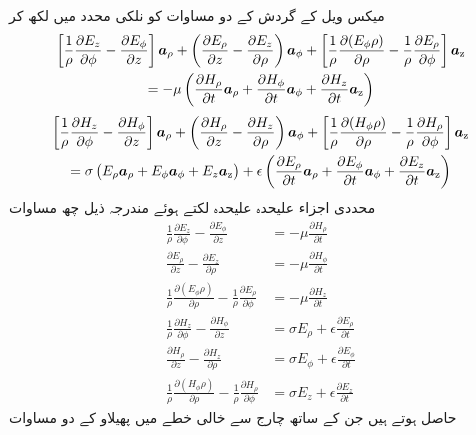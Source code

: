 میکس ویل کے  گردش کے دو مساوات  کو نلکی محدد میں لکھ کر
\begin{multline*}
\left[\frac{1}{\rho}\frac{\partial E_z}{\partial \phi} -\frac{\partial E_{\phi}}{\partial z}\right]{\boldsymbol{a}}_{\rho}+\left(\frac{\partial E_\rho}{\partial z}-\frac{\partial E_z}{\partial \rho} \right){\boldsymbol{a}}_{\phi}+\left[\frac{1}{\rho}\frac{\partial (E_{\phi}\rho )}{\partial \rho}-\frac{1}{\rho}\frac{\partial E_{\rho}}{\partial \phi}\right]{\boldsymbol{a}}_{\textup{z}} \\
=-\mu \left(\frac{\partial H_{\rho}}{\partial t} {\boldsymbol{a}}_{\rho}+\frac{\partial H_{\phi}}{\partial t}{\boldsymbol{a}}_{\phi}+\frac{\partial H_{z}}{\partial t} {\boldsymbol{a}}_{\textup{z}} \right)
\end{multline*}
%
\begin{multline*}
\left[\frac{1}{\rho}\frac{\partial H_z}{\partial \phi} -\frac{\partial H_{\phi}}{\partial z}\right]{\boldsymbol{a}}_{\rho}+\left(\frac{\partial H_\rho}{\partial z}-\frac{\partial H_z}{\partial \rho} \right){\boldsymbol{a}}_{\phi}+\left[\frac{1}{\rho}\frac{\partial (H_{\phi}\rho )}{\partial \rho}-\frac{1}{\rho}\frac{\partial H_{\rho}}{\partial \phi}\right]{\boldsymbol{a}}_{\textup{z}} \\
=\sigma\left(E_{\rho}{\boldsymbol{a}}_{\rho}+E_{\phi}{\boldsymbol{a}}_{\phi}+E_z {\boldsymbol{a}}_{\textup{z}} \right)+\epsilon \left(\frac{\partial E_{\rho}}{\partial t}{\boldsymbol{a}}_{\rho}+\frac{\partial E_{\phi}}{\partial t} {\boldsymbol{a}}_{\phi}+\frac{\partial E_{z}}{\partial t} {\boldsymbol{a}}_{\textup{z}}\right)
\end{multline*} 
محددی اجزاء علیحدہ علیحدہ لکتے ہوئے مندرجہ ذیل چھ مساوات
\begin{align}
\frac{1}{\rho}\frac{\partial E_z}{\partial \phi} -\frac{\partial E_{\phi}}{\partial z}&=-\mu \frac{\partial H_{\rho}}{\partial t} \label{مساوات_مویج_نلکی_الف}\\
\frac{\partial E_\rho}{\partial z}-\frac{\partial E_z}{\partial \rho}&=-\mu\frac{\partial H_{\phi}}{\partial t}\\
\frac{1}{\rho}\frac{\partial (E_{\phi}\rho )}{\partial \rho}-\frac{1}{\rho}\frac{\partial E_{\rho}}{\partial \phi} &=-\mu \frac{\partial H_{z}}{\partial t}\\
\frac{1}{\rho}\frac{\partial H_z}{\partial \phi} -\frac{\partial H_{\phi}}{\partial z}&=\sigma E_{\rho}+\epsilon \frac{\partial E_{\rho}}{\partial t}\\
\frac{\partial H_\rho}{\partial z}-\frac{\partial H_z}{\partial \rho}&=\sigma E_{\phi}+\epsilon \frac{\partial E_{\phi}}{\partial t} \\
\frac{1}{\rho}\frac{\partial (H_{\phi}\rho )}{\partial \rho}-\frac{1}{\rho}\frac{\partial H_{\rho}}{\partial \phi}&=\sigma E_z +\epsilon\frac{\partial E_{z}}{\partial t} 
\end{align}
حاصل ہوتے ہیں جن کے ساتھ چارج سے خالی  خطے میں پھیلاو کے دو مساوات

